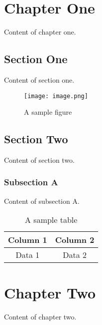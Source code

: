 \documentclass{book}
\begin{document}
\chapter{Chapter One}
Content of chapter one.

\section{Section One}
Content of section one.

\begin{figure}
\centering
\texttt{[image: image.png]}
\caption{A sample figure}
\label{fig:sample}
\end{figure}

\section{Section Two}
Content of section two.

\subsection{Subsection A}
Content of subsection A.

\begin{table}
\centering
\begin{tabular}{|c|c|}
\hline
Column 1 & Column 2 \\
\hline
Data 1 & Data 2 \\
\hline
\end{tabular}
\caption{A sample table}
\end{table}

\chapter{Chapter Two}
Content of chapter two.
\end{document}
